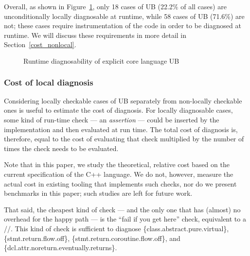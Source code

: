 Overall, as shown in Figure~\ref{piechart_locally}, only 18 cases of UB (22.2\% of all cases) are unconditionally locally diagnosable at runtime, while 58 cases of UB (71.6\%) are not; these cases require instrumentation of the code in order to be diagnosed at runtime. We will discuss these requirements in more detail in Section~\ref{cost_nonlocal}.

\begin{figure}[b]
    \centering
    \caption{Runtime diagnosability of explicit core language UB}
    \label{piechart_locally}
\end{figure}

\subsubsection{Cost of local diagnosis}
\label{cost_local}

Considering locally checkable cases of UB separately from non-locally checkable ones is useful to estimate the cost of diagnosis. For locally diagnosable cases, some kind of run-time check --- an \emph{assertion} --- could be inserted by the implementation and then evaluated at run time. The total cost of diagnosis is, therefore, equal to the cost of evaluating that check multiplied by the number of times the check needs to be evaluated.

Note that in this paper, we study the theoretical, relative cost based on the current specification of the C++ language. We do not, however, measure the actual cost in existing tooling that implements such checks, nor do we present benchmarks in this paper; such studies are left for future work.

That said, the cheapest kind of check --- and the only one that has (almost) no overhead for the happy path --- is the ``fail if you get here'' check, equivalent to a //. This kind of check is sufficient to diagnose \{class.abstract.pure.virtual\}, \{stmt.return.flow.off\}, \{stmt.return.coroutine.flow.off\}, and \{dcl.attr.noreturn.eventually.returns\}.

